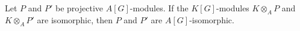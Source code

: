 Let $P$ and $P'$ be projective $A[G]$-modules. If the $K[G]$-modules $K \otimes_A P$ and $K \otimes_A P'$ are isomorphic, then $P$ and $P'$ are $A[G]$-isomorphic.
